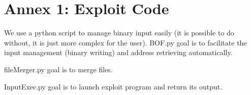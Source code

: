 \documentclass[a4paper, 11pt]{article}
\begin{document}
\clearpage 



\clearpage 
\appendix
\section{Annex 1: Exploit Code}


We use a python script to manage binary input easily (it is possible to do without, it is just more complex for the user). 
BOF.py goal is to facilitate the input management (binary writing) and address retrieving automatically.

fileMerger.py goal is to merge files.

InputExec.py goal is to launch exploit program and return its output.

\end{document}
